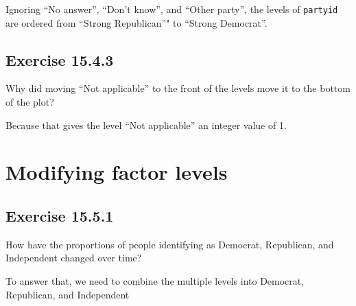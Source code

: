 \documentclass[]{book}
\newenvironment{Shaded}{\begin{snugshade}}{\end{snugshade}}
\newcommand{\CommentTok}[1]{\textcolor[rgb]{0.56,0.35,0.01}{\textit{#1}}}
\newcommand{\KeywordTok}[1]{\textcolor[rgb]{0.13,0.29,0.53}{\textbf{#1}}}
\newcommand{\NormalTok}[1]{#1}
\newcommand{\OperatorTok}[1]{\textcolor[rgb]{0.81,0.36,0.00}{\textbf{#1}}}
\theoremstyle{plain}
\theoremstyle{remark}
\begin{document}
Ignoring ``No answer'', ``Don't know'', and ``Other party'', the levels
of \texttt{partyid} are ordered from ``Strong Republican''" to ``Strong
Democrat''.

\begin{Shaded}
\end{Shaded}

\hypertarget{exercise-15.4.3}{%
\subsection*{\texorpdfstring{Exercise
{15.4.3}}{Exercise 15.4.3}}\label{exercise-15.4.3}}

Why did moving ``Not applicable'' to the front of the levels move it to
the bottom of the plot?

Because that gives the level ``Not applicable'' an integer value of 1.

\hypertarget{modifying-factor-levels}{%
\section{Modifying factor levels}\label{modifying-factor-levels}}

\hypertarget{exercise-15.5.1}{%
\subsection*{\texorpdfstring{Exercise
{15.5.1}}{Exercise 15.5.1}}\label{exercise-15.5.1}}

How have the proportions of people identifying as Democrat, Republican,
and Independent changed over time?

To answer that, we need to combine the multiple levels into Democrat,
Republican, and Independent

\begin{Shaded}
\end{Shaded}
\end{document}
